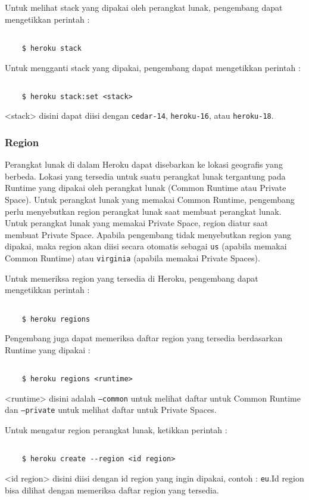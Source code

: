 Untuk melihat stack yang dipakai oleh perangkat lunak, pengembang dapat mengetikkan perintah :
\begin{lstlisting}

	$ heroku stack

\end{lstlisting}

Untuk mengganti stack yang dipakai, pengembang dapat mengetikkan perintah :
\begin{lstlisting}

	$ heroku stack:set <stack>

\end{lstlisting}
<stack> disini dapat diisi dengan \texttt{cedar-14}, \texttt{heroku-16}, atau \texttt{heroku-18}.

\subsubsection{Region}
Perangkat lunak di dalam Heroku dapat disebarkan ke lokasi geografis yang berbeda. Lokasi yang tersedia untuk suatu perangkat lunak tergantung pada Runtime yang dipakai oleh perangkat lunak (Common Runtime atau Private Space). Untuk perangkat lunak yang memakai Common Runtime, pengembang perlu menyebutkan region perangkat lunak saat membuat perangkat lunak. Untuk perangkat lunak yang memakai Private Space, region diatur saat membuat Private Space. Apabila pengembang tidak menyebutkan region yang dipakai, maka region akan diisi secara otomatis sebagai \texttt{us} (apabila memakai Common Runtime) atau \texttt{virginia} (apabila memakai Private Spaces).

Untuk memeriksa region yang tersedia di Heroku, pengembang dapat mengetikkan perintah :
\begin{lstlisting}

	$ heroku regions

\end{lstlisting}

Pengembang juga dapat memeriksa daftar region yang tersedia berdasarkan Runtime yang dipakai :
\begin{lstlisting}

	$ heroku regions <runtime>

\end{lstlisting}
<runtime> disini adalah \texttt{--common} untuk melihat daftar untuk Common Runtime dan \texttt{--private} untuk melihat daftar untuk Private Spaces.

Untuk mengatur region perangkat lunak, ketikkan perintah :
\begin{lstlisting}

	$ heroku create --region <id region>

\end{lstlisting}
<id region> disini diisi dengan id region yang ingin dipakai, contoh : \texttt{eu}.Id region bisa dilihat dengan memeriksa daftar region yang tersedia.


